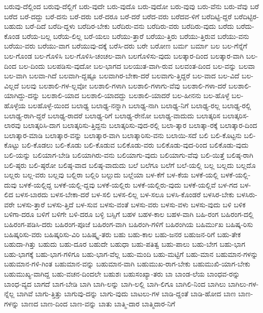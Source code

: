 {ಬರುವು-ದೆಲ್ಲಿಂದ
ಬರುವು-ದೆಲ್ಲಿಗೆ
ಬರು-ವುದೇ
ಬರು-ವುದೊ
ಬರು-ವುದೋ
ಬರು-ವುವು
ಬರು-ವೆನು
ಬರು-ವೆವು
ಬರೆ
ಬರೆದ
ಬರೆ-ದದ್ದು
ಬರೆ-ದನು
ಬರೆ-ದರು
ಬರೆ-ದರೂ
ಬರೆ-ದರೆ
ಬರೆದ-ವರು
ಬರೆದವ-ಳಿಗೆ
ಬರೆದಿಟ್ಟಿ-ದ್ದರೆ
ಬರೆದಿಟ್ಟಿರ-ಬಹುದು
ಬರೆ-ದಿದೆ
ಬರೆದಿ-ದ್ದಳು
ಬರೆದಿರ-ಬೇಕು
ಬರೆದಿರು-ವನು
ಬರೆದಿರು-ವರು
ಬರೆದಿರು-ವುದು
ಬರೆದು
ಬರೆದು-ಕೊಂಡ
ಬರೆಯ-ಬಲ್ಲ
ಬರೆಯ-ಲಿಲ್ಲ
ಬರೆ-ಯಲು
ಬರೆಯು-ತ್ತಾರೆ
ಬರೆಯು-ತ್ತಿರು
ಬರೆಯು-ತ್ತಿರುವ
ಬರೆಯು-ವನು
ಬರೆಯು-ವರು
ಬರೆಯು-ವಾಗ
ಬರೆಯುವು-ದಕ್ಕೆ
ಬರೆಸಿ-ದರು
ಬರೇ
ಬರೋಣ
ಬರ್ಮ
ಬರ್ಮಾ
ಬಲ
ಬಲ-ಗೆನ್ನೆಗೆ
ಬಲ-ಗೊಂಡ
ಬಲ-ಗೊಳಿಸಿ
ಬಲ-ಗೊಳಿಸಿ-ಚಂಚಲ-ವಾಗಿ
ಬಲಗೊಳಿಸು-ವುದು
ಬಲತ್ಕಾರ-ದಿಂದ
ಬಲತ್ಕಾರ-ವಾಗಿ
ಬಲ-ದಿಂದ
ಬಲ-ದಿಂದು
ಬಲಪಡಿಸು-ವುದೋ
ಬಲ-ಭಾಗದ
ಬಲಯುತ-ವಾಗಿ-ರುವ
ಬಲವಂತ-ದಿಂದ
ಬಲ-ವನ್ನು
ಬಲವಾ
ಬಲ-ವಾಗಿ
ಬಲವಾ-ಗಿದೆ
ಬಲವಾಗಿ-ದ್ದಷ್ಟೂ
ಬಲವಾಗಿರ-ಬೇಕಾ-ದರೆ
ಬಲವಾಗು-ತ್ತಿದ್ದರೆ
ಬಲ-ವಾದ
ಬಲ-ವಿದೆ
ಬಲ-ವಿಲ್ಲದೆ
ಬಲವು
ಬಲಶಾಲಿ-ಗಳ-ಲ್ಲವೋ
ಬಲಶಾಲಿ-ಗಳಾಗಿ
ಬಲಶಾಲಿ-ಗಳಾಗು-ವೆವು
ಬಲಶಾಲಿ-ಗಳಾ-ದರೆ
ಬಲಶಾಲಿ-ಯಾಗಿದ್ದು-ದನ್ನು
ಬಲಶಾಲಿ-ಯಾದ
ಬಲಶಾಲಿ-ಯಾದದ್ದು
ಬಲಶಾಲಿ-ಯಾದರೆ
ಬಲ-ಹೀನನು
ಬಲ-ಹೊಳ್ಳೆ
ಬಲ-ಹೊಳ್ಳೆಯ
ಬಲಹೊಳ್ಳೆ-ಯಿಂದ
ಬಲಾಢ್ಯ
ಬಲಾಢ್ಯ-ನನ್ನಾಗಿ
ಬಲಾಢ್ಯ-ನಾಗಿ
ಬಲಾಢ್ಯ-ನಿಗೆ
ಬಲಾಢ್ಯ-ರಲ್ಲ
ಬಲಾಢ್ಯ-ರಲ್ಲಿ
ಬಲಾಢ್ಯ-ರಾಗಿ-ದ್ದರೆ
ಬಲಾಢ್ಯ-ರಾದರೆ
ಬಲಾಢ್ಯ-ರಿಗೆ
ಬಲಾಢ್ಯ-ರೇನೋ
ಬಲಾಢ್ಯ-ವಾದುದು
ಬಲಾತ್ಕರಿಸ
ಬಲಾತ್ಕರಿಸ-ಲಾರವು
ಬಲಾತ್ಕರಿಸಿ-ದಾಗ
ಬಲಾತ್ಕರಿಸು-ತ್ತಿದ್ದನು
ಬಲಾತ್ಕರಿಸು-ವುದ-ರಲ್ಲಿ
ಬಲಾ-ತ್ಕಾರ
ಬಲಾತ್ಕಾ-ರಕ್ಕೆ
ಬಲಾತ್ಕಾರ-ದಿಂದ
ಬಲಾತ್ಕಾರ-ಮಾಡಿ
ಬಲಾತ್ಕಾರ-ವನ್ನು
ಬಲಾತ್ಕಾರ-ವಾಗಿ
ಬಲಾತ್ಕಾರಿಸು-ವನು
ಬಲಾಯಿ-ಸದೆ
ಬಲಿ
ಬಲಿ-ಕೊಟ್ಟನು
ಬಲಿ-ಕೊಟ್ಟು
ಬಲಿ-ಕೊಡಲು
ಬಲಿ-ಕೊಡು
ಬಲಿ-ಕೊಡುವ
ಬಲಿಕೊಡು-ವರು
ಬಲಿಕೊಡು-ವುದ-ರಿಂದ
ಬಲಿಕೊಡು-ವುದು
ಬಲಿ-ಯನ್ನು
ಬಲಿಯಾಗ-ಬೇಡಿ
ಬಲಿಯಾಗಿರು-ವನು
ಬಲಿಯಾಗು-ವುದು
ಬಲಿಯಾಗು-ವೆವು
ಬಲಿ-ಯಿತ್ತೆ
ಬಲಿಷ್ಠ-ರಾಗಿ
ಬಲಿ-ಷ್ಠರು
ಬಲಿ-ಷ್ಠರೋ
ಬಲಿಷ್ಠ-ವಾದ
ಬಲಿಷ್ಠ-ವಾದುದು
ಬಲೆ
ಬಲೆಗೂ
ಬಲೆಗೆ
ಬಲೆ-ಯಲ್ಲಿ
ಬಲ್ಲ
ಬಲ್ಲದು
ಬಲ್ಲದೊ
ಬಲ್ಲರು
ಬಲ್ಲ-ವರು
ಬಲ್ಲವು
ಬಲ್ಲಿರಾ
ಬಲ್ಲಿರಿ
ಬಲ್ಲುದು
ಬಲ್ಲೆಯಾ
ಬಳ-ಕೆಗೆ
ಬಳ-ಕೆಯ
ಬಳಕೆ-ಯಲ್ಲಿ
ಬಳಕೆ-ಯಲ್ಲಿ-ದುವು
ಬಳಕೆ-ಯಲ್ಲಿದ್ದ
ಬಳಕೆ-ಯಲ್ಲಿ-ದ್ದವು
ಬಳಕೆ-ಯಲ್ಲಿರು
ಬಳಕೆ-ಯಲ್ಲಿರು-ವುದು
ಬಳಕೆ-ಯಲ್ಲಿವೆ
ಬಳ-ಗದ
ಬಳ-ಲಿದ
ಬಳಸ-ಬಾರದು
ಬಳಸ-ಬೇಕಾ-ದರೆ
ಬಳ-ಸಲಿ
ಬಳಸ-ಲಿಲ್ಲ
ಬಳ-ಸಲೂ
ಬಳಸಿ-ಕೊಂಡರೆ
ಬಳಸಿರ-ಬೇಕು
ಬಳಸಿರು-ವರೇ
ಬಳಸು-ತ್ತಾರೆ
ಬಳಸು-ತ್ತಿದೆ
ಬಳ-ಸುವ
ಬಳಸು-ವಂತೆ
ಬಳಸು-ವರು
ಬಳಸು-ವಳು
ಬಳಸು-ವುದು
ಬಳಿ
ಬಳಿಕ
ಬಳಿಗಾ-ದರೂ
ಬಳಿಗೆ
ಬಳಿಗೇ
ಬಳಿ-ದರೂ
ಬಳ್ಳಿ
ಬಸ್ಸಿಗೆ
ಬಹಳ
ಬಹಳ-ಕಾಲ
ಬಹಳ-ವಾಗಿ
ಬಹಿ-ರಂಗ
ಬಹಿರಂಗ-ದಲ್ಲಿ
ಬಹಿರಂಗ-ಪಡಿಸಿ-ದರು
ಬಹಿರಂಗ-ಪೂಜೆ
ಬಹಿರಂಗ-ವಾಗಿ
ಬಹಿರಂಗಿ-ಗಳಿಗೆ
ಬಹಿರಂಗಿಯ
ಬಹಿರ್ಮುಖ
ಬಹಿಷ್ಕ-ರಿಸು
ಬಹಿಷ್ಕರಿಸು-ವರು
ಬಹಿಷ್ಕರಿಸು-ವಿರಿ
ಬಹಿಷ್ಕೃ-ತರು
ಬಹು
ಬಹು-ಕಾಲ
ಬಹು-ಜನರ
ಬಹುಜನ-ರಿಗೆ
ಬಹು-ತೇಕ
ಬಹುದಾ-ಗಿತ್ತು
ಬಹುದು
ಬಹು-ದೂರ
ಬಹುದೇ
ಬಹುಧಾ
ಬಹು-ಪತಿತ್ವ
ಬಹು-ಪಾಲು
ಬಹು-ಬೇಗ
ಬಹು-ಭಾಗ
ಬಹು-ಭಾಗಕ್ಕೆ
ಬಹು-ಭಾಗ-ಗಳಿಗೂ
ಬಹು-ಭಾಗ-ವೆಲ್ಲ
ಬಹು-ಮಂದಿ
ಬಹು-ಮಟ್ಟಿಗೆ
ಬಹು-ಮಾನ
ಬಹುಮಾನ-ಗಳನ್ನು
ಬಹುಮಾನ-ಗಳಿ-ಗಿಂತ
ಬಹುಮಾನ-ವನ್ನು
ಬಹುಮಾನ-ವಾಗಿ
ಬಹುಮುಖ-ರಾಗ-ಬೇಕು
ಬಹುಮುಖಿ-ಯಾಗ-ಬೇಕು
ಬಹುಮುಖ್ಯ-ವಾಗಿದ್ದ
ಬಹು-ವಚನ-ದಿಂದಲೇ
ಬಹುಶಃ
ಬಹುಸಂಖ್ಯಾ-ತರು
ಬಾ
ಬಾಂಡ-ಲೆಯ
ಬಾಂಧವ-ರನ್ನು
ಬಾಂಧ-ವ್ಯದ
ಬಾಗದೆ
ಬಾಗ-ಬೇಡಿ
ಬಾಗಿ
ಬಾಗಿ-ಲನ್ನು
ಬಾಗಿ-ಲಲ್ಲಿ
ಬಾಗಿ-ಲಿಗೂ
ಬಾಗಿಲಿ-ನಿಂದ
ಬಾಗಿಲು
ಬಾಗಿಲು-ಗಳ-ನ್ನೆಲ್ಲ
ಬಾಗಿವೆ
ಬಾಗು-ತ್ತಿತ್ತು
ಬಾಗುವು-ದನ್ನು
ಬಾಗು-ವುದು
ಬಾಟಲು-ಗಳ
ಬಾಡಿ-ದ್ದಂತೆ
ಬಾಡಿ-ಹೋದ
ಬಾಣ
ಬಾಣ-ಗಳನ್ನು
ಬಾಣದ
ಬಾಣ-ದಿಂದ
ಬಾಣ-ವನ್ನು
ಬಾತು
ಬಾತ್ಮಿ-ದಾರ
ಬಾತ್ಮಿದಾರ-ನಿಗೆ
}
